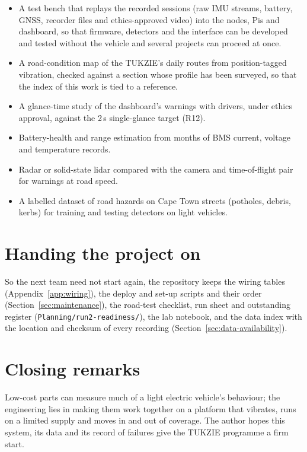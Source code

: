 \begin{itemize}
\item A test bench that replays the recorded sessions (raw IMU streams, battery, GNSS, recorder files and ethics-approved video) into the nodes, Pis and dashboard, so that firmware, detectors and the interface can be developed and tested without the vehicle and several projects can proceed at once.
\item A road-condition map of the TUKZIE's daily routes from position-tagged vibration, checked against a section whose profile has been surveyed, so that the index of this work is tied to a reference.
\item A glance-time study of the dashboard's warnings with drivers, under ethics approval, against the 2\,s single-glance target (R12).
\item Battery-health and range estimation from months of BMS current, voltage and temperature records.
\item Radar or solid-state lidar compared with the camera and time-of-flight pair for warnings at road speed.
\item A labelled dataset of road hazards on Cape Town streets (potholes, debris, kerbs) for training and testing detectors on light vehicles.
\end{itemize}

\section{Handing the project on}
\label{sec:recs-handover}

So the next team need not start again, the repository keeps the wiring tables (Appendix~\ref{app:wiring}), the deploy and set-up scripts and their order (Section~\ref{sec:maintenance}), the road-test checklist, run sheet and outstanding register (\texttt{Planning/run2-readiness/}), the lab notebook, and the data index with the location and checksum of every recording (Section~\ref{sec:data-availability}).

\section{Closing remarks}
\label{sec:recs-closing}

Low-cost parts can measure much of a light electric vehicle's behaviour; the engineering lies in making them work together on a platform that vibrates, runs on a limited supply and moves in and out of coverage. The author hopes this system, its data and its record of failures give the TUKZIE programme a firm start.
